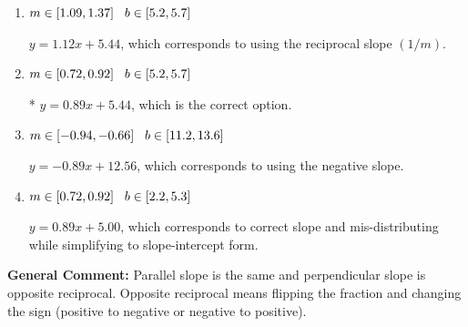 \documentclass{extbook}[14pt]
\begin{document}
\begin{enumerate}
{\begin{enumerate}[label=\Alph*.]
 $y = 0.89x - 5.44$, which corresponds to using the correct slope and getting the negative $y$-intercept.
\item \( m \in [1.09, 1.37] \hspace*{3mm} b \in [5.2, 5.7] \)

 $y = 1.12x + 5.44$, which corresponds to using the reciprocal slope $(1/m)$.
\item \( m \in [0.72, 0.92] \hspace*{3mm} b \in [5.2, 5.7] \)

* $y = 0.89x + 5.44$, which is the correct option.
\item \( m \in [-0.94, -0.66] \hspace*{3mm} b \in [11.2, 13.6] \)

 $y = -0.89x + 12.56$, which corresponds to using the negative slope.
\item \( m \in [0.72, 0.92] \hspace*{3mm} b \in [2.2, 5.3] \)

 $y = 0.89x + 5.00$, which corresponds to correct slope and mis-distributing while simplifying to slope-intercept form.
\end{enumerate}

\textbf{General Comment:} Parallel slope is the same and perpendicular slope is opposite reciprocal. Opposite reciprocal means flipping the fraction and changing the sign (positive to negative or negative to positive).
}
\end{enumerate}
\end{document}
